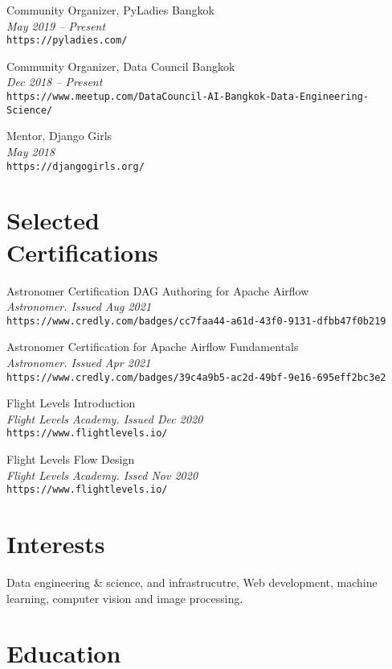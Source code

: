 \documentclass[margin, 10pt]{res}
\begin{document}
\begin{resume}
Community Organizer, PyLadies Bangkok\\
{\it \small May 2019 -- Present}\\
{\tt https://pyladies.com/}

Community Organizer, Data Council Bangkok\\
{\it \small Dec 2018 -- Present}\\
{\tt https://www.meetup.com/DataCouncil-AI-Bangkok-Data-Engineering-Science/}

Mentor, Django Girls\\
{\it \small May 2018}\\
{\tt https://djangogirls.org/}

\section{Selected \\ Certifications}

Astronomer Certification DAG Authoring for Apache Airflow\\
{\it \small Astronomer. Issued Aug 2021}\\
{\tt https://www.credly.com/badges/cc7faa44-a61d-43f0-9131-dfbb47f0b219}

Astronomer Certification for Apache Airflow Fundamentals\\
{\it \small Astronomer. Issued Apr 2021}\\
{\tt https://www.credly.com/badges/39c4a9b5-ac2d-49bf-9e16-695eff2bc3e2}

Flight Levels Introduction\\
{\it \small Flight Levels Academy. Issued Dec 2020}\\
{\tt https://www.flightlevels.io/}

Flight Levels Flow Design\\
{\it \small Flight Levels Academy. Issed Nov 2020}\\
{\tt https://www.flightlevels.io/}

\section{Interests}

Data engineering \& science, and infrastrucutre, Web development, 
machine learning, computer vision and image processing.

\section{Education}


\end{resume}
\end{document}
